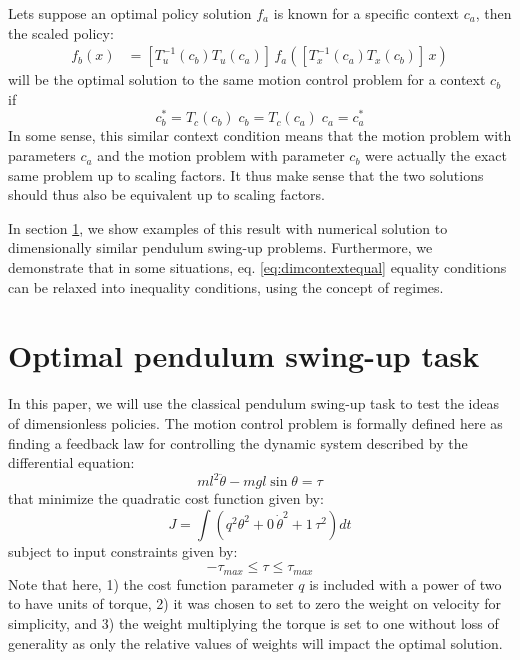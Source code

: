 Lets suppose an optimal policy solution $f_a$ is known for a specific context $c_a$, then the scaled policy:
\begin{align}
f_b ( x ) &= 
\left[ T^{-1}_u(c_b) 
T_u(c_a) \right] \,
f_a \left( 
\left[
T_x^{-1}(c_a) 
T_x(c_b)
\right] \,
x
\right)
\label{eq:ab_transform}
\end{align}
will be the optimal solution to the same motion control problem for a context $c_b$ if 
\begin{equation}
c_b^* =  T_c( c_b ) \; c_b  = T_c( c_a ) \; c_a = c_a^* 
\label{eq:dimcontextequal}
\end{equation}
In some sense, this similar context condition means that the motion problem with parameters $c_a$ and the motion problem with parameter $c_b$ were actually the exact same problem up to scaling factors. It thus make sense that the two solutions should thus also be equivalent up to scaling factors. 

In section \ref{sec:optimalswingup}, we show examples of this result with numerical solution to dimensionally similar pendulum swing-up problems. Furthermore, we demonstrate that in some situations, eq. \eqref{eq:dimcontextequal} equality conditions can be relaxed into inequality conditions, using the concept of regimes.



\section{Optimal pendulum swing-up task}
\label{sec:optimalswingup}
In this paper, we will use the classical pendulum swing-up task to test the ideas of dimensionless policies. The motion control problem is formally defined here as finding a feedback law for controlling the dynamic system described by the differential equation:
\begin{equation}
ml^2 \ddot{\theta} - mgl \sin \theta = \tau
\label{eq:pendulum_dynamics}
\end{equation}
that minimize the quadratic cost function given by:
\begin{equation}
J = \int{( q^2 \theta^2 + 0 \, \dot{\theta}^2 + 1 \, \tau^2 ) dt }
\label{eq:pendulum_cost}
\end{equation}
subject to input constraints given by:
\begin{equation}
- \tau_{max} \leq \tau \leq \tau_{max}
\label{eq:pendulum_constraints}
\end{equation}
Note that here, 1) the cost function parameter $q$ is included with a power of two to have units of torque, 2) it was chosen to set to zero the weight on velocity for simplicity, and 3) the weight multiplying the torque is set to one without loss of generality as only the relative values of weights will impact the optimal solution. 

